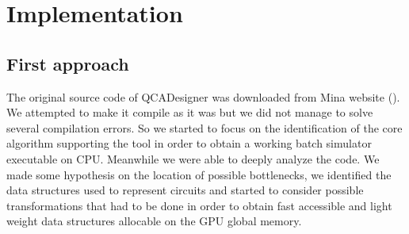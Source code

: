 \chapter{Implementation}\label{sec:implementation}
\section{First approach}
The original source code of QCADesigner was downloaded from Mina website (\cite{site:QCADesigner}). We attempted to make it compile as it was but we did not
manage to solve several compilation errors. So we started to focus on the identification of the core algorithm supporting the tool in
order to obtain a working batch simulator executable on CPU. Meanwhile we were able to deeply
analyze the code. We made some hypothesis on the location of possible bottlenecks, we identified the data structures used to represent 
circuits and started to consider possible transformations that had to be done in order to obtain fast accessible and light weight data 
structures allocable on the GPU global memory.

